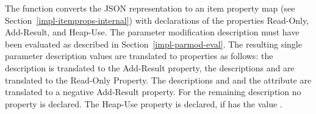 The function  converts the JSON representation to an item
property map (see Section~\ref{impl-itemprops-internal}) with declarations of the properties Read-Only, Add-Result, and Heap-Use.
The parameter modification description must have been evaluated as described in Section~\ref{impl-parmod-eval}. The 
resulting single parameter description values are translated to properties as follows: the description 
is translated to the Add-Result property, the descriptions  and  are translated to the 
Read-Only Property. The descriptions  and  and the 
attribute are translated to a negative Add-Result property. For the remaining description  no property is declared.
The Heap-Use property is declared, if  has the value .
